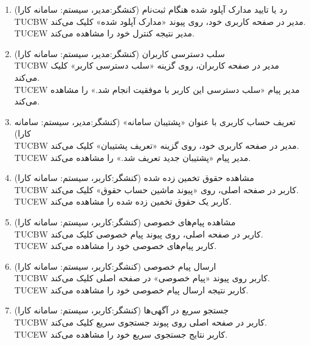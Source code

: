 \documentclass[12pt]{article}
\begin{document}
\begin{enumerate}
		\item
		رد یا تایید مدارک آپلود شده هنگام ثبت‌نام (کنشگر:‌مدیر، سیستم: سامانه کارا)\\
		TUCBW مدیر در صفحه کاربری خود، روی پیوند «مدارک آپلود شده» کلیک می‌کند.\\
		TUCEW مدیر نتیجه کنترل خود را مشاهده می‌کند.\\

		\item
		سلب دسترسی کاربران (کنشگر:‌مدیر، سیستم: سامانه کارا)\\
		TUCBW مدیر در صفحه کاربران، روی گزینه «سلب دسترسی کاربر» کلیک می‌کند.\\
		TUCEW مدیر پیام «سلب دسترسی این کاربر با موفقیت انجام شد.» را مشاهده می‌کند.\\

		\item
		تعریف حساب کاربری با عنوان «پشتیبان سامانه» (کنشگر:‌مدیر، سیستم: سامانه کارا)\\
		TUCBW مدیر در صفحه کاربری خود، روی گزینه «تعریف پشتیبان» کلیک می‌کند.\\
		TUCEW مدیر پیام «پشتیبان جدید تعریف شد.» را مشاهده می‌کند.\\

		\item
		مشاهده حقوق تخمین زده شده (کنشگر:‌کاربر، سیستم: سامانه کارا)\faStar\\
		TUCBW کاربر در صفحه اصلی، روی «پیوند ماشین حساب حقوق» کلیک می‌کند.\\
		TUCEW کاربر یک حقوق تخمین زده شده را مشاهده می‌کند.\\

		\item
		مشاهده پیام‌های خصوصی (کنشگر:‌کاربر، سیستم: سامانه کارا)\\
		TUCBW کاربر در صفحه اصلی، روی پیوند پیام خصوصی کلیک می‌کند.\\
		TUCEW کاربر پیام‌های خصوصی خود را مشاهده می‌کند.\\

		\item
		ارسال پیام خصوصی (کنشگر:‌کاربر، سیستم: سامانه کارا)\faStar\\
		TUCBW کاربر روی پیوند «پیام خصوصی» در صفحه اصلی کلیک می‌کند.\\
		TUCEW کاربر نتیجه ارسال پیام خصوصی خود را مشاهده می‌کند.\\

		\item
		جستجو سریع در آگهی‌ها (کنشگر:‌کاربر، سیستم: سامانه کارا)\\
		TUCBW کاربر در صفحه اصلی روی پیوند جستجوی سریع کلیک می‌کند.\\
		TUCEW کاربر نتایج جستجوی سریع خود را مشاهده می‌کند.\\


\end{enumerate}
\end{document}
